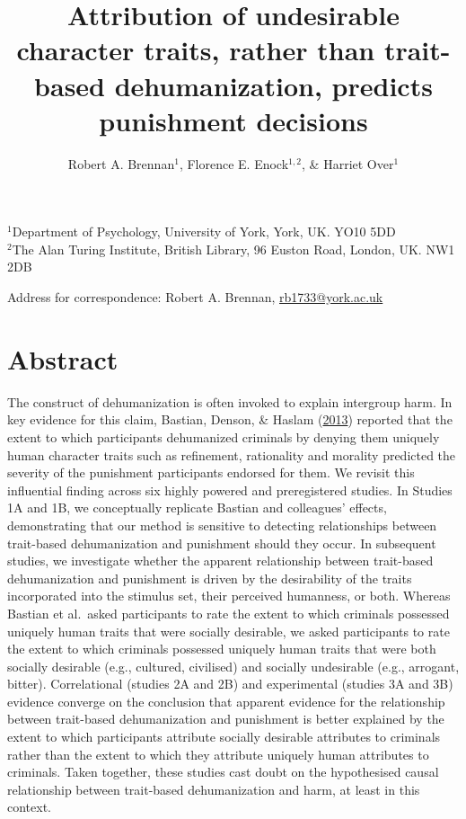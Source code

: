 \documentclass[
]{article}
\title{Attribution of undesirable character traits, rather than trait-based dehumanization, predicts punishment decisions}
\author{Robert A. Brennan\(^1\), Florence E. Enock\(^{1,2}\), \& Harriet Over\(^1\)}
\date{}
\begin{document}
\maketitle

\(^1\)Department of Psychology, University of York, York, UK. YO10 5DD\\
\(^2\)The Alan Turing Institute, British Library, 96 Euston Road, London, UK. NW1 2DB

Address for correspondence: Robert A. Brennan, \url{rb1733@york.ac.uk}

\hypertarget{abstract}{%
\section{Abstract}\label{abstract}}

The construct of dehumanization is often invoked to explain intergroup harm. In key evidence for this claim, Bastian, Denson, \& Haslam (\protect\hyperlink{ref-Bastian2013}{2013}) reported that the extent to which participants dehumanized criminals by denying them uniquely human character traits such as refinement, rationality and morality predicted the severity of the punishment participants endorsed for them. We revisit this influential finding across six highly powered and preregistered studies. In Studies 1A and 1B, we conceptually replicate Bastian and colleagues' effects, demonstrating that our method is sensitive to detecting relationships between trait-based dehumanization and punishment should they occur. In subsequent studies, we investigate whether the apparent relationship between trait-based dehumanization and punishment is driven by the desirability of the traits incorporated into the stimulus set, their perceived humanness, or both. Whereas Bastian et al.~asked participants to rate the extent to which criminals possessed uniquely human traits that were socially desirable, we asked participants to rate the extent to which criminals possessed uniquely human traits that were both socially desirable (e.g., cultured, civilised) and socially undesirable (e.g., arrogant, bitter). Correlational (studies 2A and 2B) and experimental (studies 3A and 3B) evidence converge on the conclusion that apparent evidence for the relationship between trait-based dehumanization and punishment is better explained by the extent to which participants attribute socially desirable attributes to criminals rather than the extent to which they attribute uniquely human attributes to criminals. Taken together, these studies cast doubt on the hypothesised causal relationship between trait-based dehumanization and harm, at least in this context.
\end{document}
